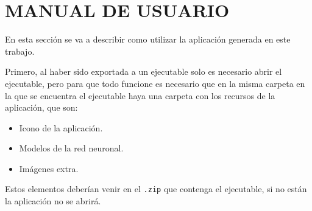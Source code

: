 \section{MANUAL DE USUARIO}

En esta sección se va a describir como utilizar la aplicación generada en este trabajo.

Primero, al haber sido exportada a un ejecutable solo es necesario abrir el ejecutable, pero para que todo funcione es necesario que en la misma carpeta en la que se encuentra el ejecutable haya una 
carpeta con los recursos de la aplicación, que son:

\begin{itemize}
    \item Icono de la aplicación.
    \item Modelos de la red neuronal.
    \item Imágenes extra.
\end{itemize}

Estos elementos deberían venir en el \texttt{.zip} que contenga el ejecutable, si no están la aplicación no se abrirá.

